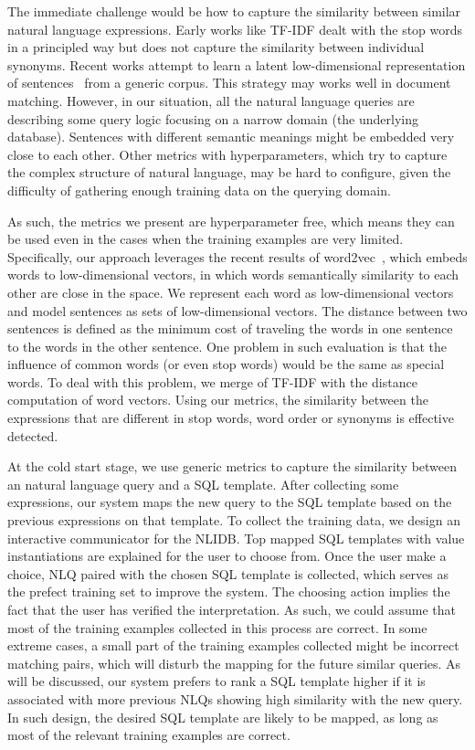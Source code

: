 \documentclass{vldb}
\begin{document}
The immediate challenge would be how to capture the similarity between similar natural language expressions.  Early works like TF-IDF dealt with the stop words in a principled way but does not capture the similarity between individual synonyms.  Recent works attempt to learn a latent low-dimensional representation of sentences~\cite{DBLP:conf/icml/LeM14} from a generic corpus.  This strategy may works well in document matching.  However, in our situation, all the natural language queries are describing some query logic focusing on a narrow domain (the underlying database).  Sentences with different semantic meanings might be embedded very close to each other.  Other metrics with hyperparameters, which try to capture the complex structure of natural language, may be hard to configure, given the difficulty of gathering enough training data on the querying domain.  

As such, the metrics we present are hyperparameter free, which means they can be used even in the cases when the training examples are very limited.  Specifically, our approach leverages the recent results of word2vec~\cite{DBLP:conf/nips/MikolovSCCD13}, which embeds words to low-dimensional vectors, in which words semantically similarity to each other are close in the space.  We represent each word as low-dimensional vectors and model sentences as sets of low-dimensional vectors.  The distance between two sentences is defined as the minimum cost of traveling the words in one sentence to the words in the other sentence.  One problem in such evaluation is that the influence of common words (or even stop words) would be the same as special words.  To deal with this problem, we merge of TF-IDF with the distance computation of word vectors.  Using our metrics, the similarity between the expressions that are different in stop words, word order or synonyms is effective detected.  

At the cold start stage, we use generic metrics to capture the similarity between an natural language query and a SQL template.  After collecting some expressions, our system maps the new query to the SQL template based on the previous expressions on that template.  To collect the training data, we design an interactive communicator for the NLIDB.  Top mapped SQL templates with value instantiations are explained for the user to choose from.  Once the user make a choice, NLQ paired with the chosen SQL template is collected, which serves as the prefect training set to improve the system.  The choosing action implies the fact that the user has verified the interpretation.  As such, we could assume that most of the training examples collected in this process are correct.  In some extreme cases, a small part of the training examples collected might be incorrect matching pairs, which will disturb the mapping for the future similar queries.  As will be discussed, our system prefers to rank a SQL template higher if it is associated with more previous NLQs showing high similarity with the new query.  In such design, the desired SQL template are likely to be mapped, as long as most of the relevant training examples are correct.  
\end{document}
